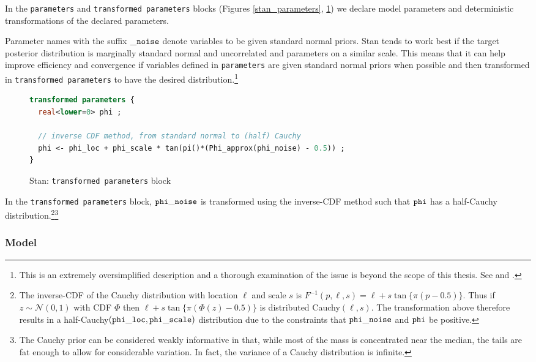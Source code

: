 In the {\tt parameters} and {\tt transformed parameters} blocks (Figures \ref{stan_parameters}, \ref{stan_transformed_parameters}) we declare model parameters and deterministic transformations of the declared parameters. 


%
\noindent Parameter names with the suffix ${\tt \_noise}$ denote variables to be given standard normal priors. Stan tends to work best if the target posterior distribution is marginally standard normal and uncorrelated and parameters on a  similar scale. This means that it can help improve efficiency and convergence if variables defined in {\tt parameters} are given standard normal priors when possible and then transformed in {\tt transformed parameters} to have the desired distribution.\footnote{This is an extremely oversimplified description and a thorough examination of the issue is beyond the scope of this thesis. See  and .} 

\begin{figure}[h]
\begin{lstlisting}[language=Stan, frame=trBL]
transformed parameters {
  real<lower=0> phi ;
  
  // inverse CDF method, from standard normal to (half) Cauchy
  phi <- phi_loc + phi_scale * tan(pi()*(Phi_approx(phi_noise) - 0.5)) ;
}
\end{lstlisting}
\caption{Stan: {\tt transformed parameters} block}
\label{stan_transformed_parameters}
\end{figure}

In the {\tt transformed parameters} block, ${\tt phi\_noise}$ is transformed using the inverse-CDF method such that ${\tt phi}$ has a half-Cauchy distribution.\footnote{The inverse-CDF of the Cauchy distribution with location $\ell$ and scale $s$ is $F^{-1}(p, \ell,s)  = \ell + s \tan{\{ \pi (p - 0.5)\}}$. Thus if $z \sim \mathcal{N}(0,1)$ with CDF $\Phi$ then $\ell + s \tan{\{ \pi (\Phi(z) - 0.5)\}}$ is distributed Cauchy$(\ell, s)$. The transformation above therefore results in a half-Cauchy$({\tt phi\_loc}, {\tt phi\_scale})$ distribution due to the constraints that ${\tt phi\_noise}$ and ${\tt phi}$ be positive.}\footnote{The Cauchy prior can be considered weakly informative in that, while most of the mass is concentrated near the median, the tails are fat enough to allow for considerable variation. In fact, the variance of a Cauchy distribution is infinite.}



\subsubsection{Model}

